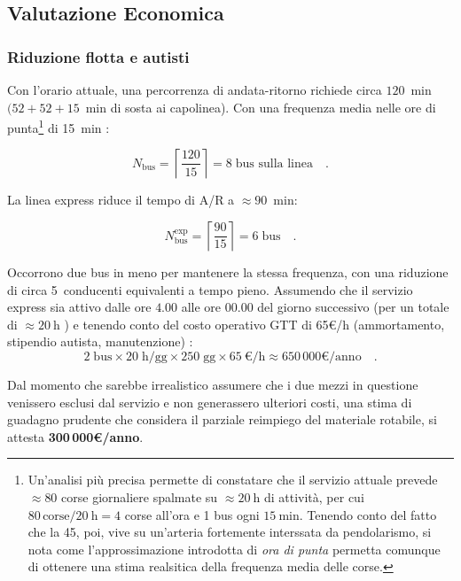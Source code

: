 \documentclass[conference]{IEEEtran}
\begin{document}
\subsection{Valutazione Economica}

\subsubsection{Riduzione flotta e autisti}
Con l'orario attuale, una percorrenza di andata-ritorno richiede
circa $120$~min $(52+52+15$~min di sosta ai capolinea). Con una
frequenza media nelle ore di punta\footnote{Un'analisi più precisa permette di constatare che il servizio attuale prevede $\approx80$ corse giornaliere spalmate su $\approx \SI{20}{\hour}$ di attività, per cui $80 \, \text{corse}/\SI{20}{\hour} = 4$ corse all'ora e 1 bus ogni $\SI{15}{\minute}$. Tenendo conto del fatto che la 45, poi, vive su un'arteria fortemente interssata da pendolarismo, si nota come l'approssimazione introdotta di \emph{ora di punta} permetta comunque di ottenere una stima realsitica della frequenza media delle corse.} di 15~min \cite{gtt_gtfs}:

\begin{equation}
  N_\text{bus} = \left\lceil\frac{120}{15}\right\rceil
  = 8\;\text{bus sulla linea} \quad.
  \label{eq:fleet_current}
\end{equation}

La linea express riduce il tempo di A/R a $\approx 90$~min:

\begin{equation}
  N_\text{bus}^\text{exp} = \left\lceil\frac{90}{15}\right\rceil
  = 6\;\text{bus} \quad.
  \label{eq:fleet_express}
\end{equation}

Occorrono due bus in meno per mantenere la stessa frequenza, con
una riduzione di circa 5~conducenti equivalenti a tempo pieno.
Assumendo che il servizio express sia attivo dalle ore $4.00$ alle ore $00.00$ del giorno successivo (per un totale di $\approx \SI{20}{\hour}$ \cite{gtt_gtfs}) e tenendo conto del costo operativo GTT di 65\euro{}/h (ammortamento, stipendio
autista, manutenzione) \cite{art_costi_standard_2021}:
\begin{equation}
  2\;\text{bus} \times 20\;\text{h/gg} \times 250\;\text{gg}
  \times \SI{65}{\euro}/\text{h} \approx 650\,000\si{\euro}/\text{anno} \quad.
  \label{eq:fleet_savings}
\end{equation}

Dal momento che sarebbe irrealistico assumere che i due mezzi in questione venissero esclusi dal servizio e non generassero ulteriori costi, una stima di guadagno prudente che considera il parziale reimpiego del materiale rotabile, si attesta \textbf{300\,000\euro{}/anno}.
\end{document}
